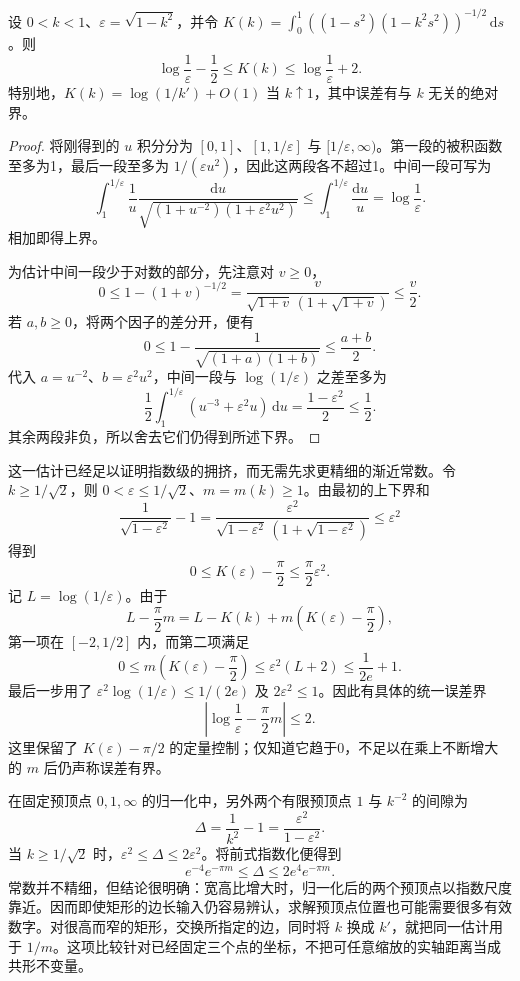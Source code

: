 \begin{proposition}[完全椭圆积分的对数界]\label{b3:prop:07-elliptic-log-bounds}
设 \(0<k<1\)、\(\varepsilon=\sqrt{1-k^2}\)，并令
\(K(k)=\int_0^1((1-s^2)(1-k^2s^2))^{-1/2}\,\mathrm{d}s\)。则
\[
 \log\frac1\varepsilon-\frac12
 \le K(k)\le\log\frac1\varepsilon+2.
\]
特别地，\(K(k)=\log(1/k')+O(1)\) 当 \(k\uparrow1\)，其中误差有与 \(k\) 无关的绝对界。
\end{proposition}
\begin{proof}
将刚得到的 \(u\) 积分分为 \([0,1]\)、\([1,1/\varepsilon]\) 与 \([1/\varepsilon,\infty)\)。第一段的被积函数至多为1，最后一段至多为 \(1/(\varepsilon u^2)\)，因此这两段各不超过1。中间一段可写为
\[
 \int_1^{1/\varepsilon}\frac1u
 \frac{\mathrm{d}u}{\sqrt{(1+u^{-2})(1+\varepsilon^2u^2)}}
 \le\int_1^{1/\varepsilon}\frac{\mathrm{d}u}{u}
 =\log\frac1\varepsilon.
\]
相加即得上界。

为估计中间一段少于对数的部分，先注意对 \(v\ge0\)，
\[
 0\le1-(1+v)^{-1/2}
 =\frac{v}{\sqrt{1+v}\,(1+\sqrt{1+v})}
 \le\frac v2.
\]
若 \(a,b\ge0\)，将两个因子的差分开，便有
\[
 0\le1-\frac1{\sqrt{(1+a)(1+b)}}
 \le\frac{a+b}{2}.
\]
代入 \(a=u^{-2}\)、\(b=\varepsilon^2u^2\)，中间一段与 \(\log(1/\varepsilon)\) 之差至多为
\[
 \frac12\int_1^{1/\varepsilon}
 (u^{-3}+\varepsilon^2u)\,\mathrm{d}u
 =\frac{1-\varepsilon^2}{2}\le\frac12.
\]
其余两段非负，所以舍去它们仍得到所述下界。
\end{proof}

这一估计已经足以证明指数级的拥挤，而无需先求更精细的渐近常数。令 \(k\ge1/\sqrt2\)，则 \(0<\varepsilon\le1/\sqrt2\)、\(m=m(k)\ge1\)。由最初的上下界和
\[
 \frac1{\sqrt{1-\varepsilon^2}}-1
 =\frac{\varepsilon^2}
 {\sqrt{1-\varepsilon^2}\,(1+\sqrt{1-\varepsilon^2})}
 \le\varepsilon^2
\]
得到
\[
 0\le K(\varepsilon)-\frac\pi2
 \le\frac\pi2\varepsilon^2.
\]
记 \(L=\log(1/\varepsilon)\)。由于
\[
 L-\frac\pi2m
 =L-K(k)+m\left(K(\varepsilon)-\frac\pi2\right),
\]
第一项在 \([-2,1/2]\) 内，而第二项满足
\[
 0\le m\left(K(\varepsilon)-\frac\pi2\right)
 \le\varepsilon^2(L+2)
 \le\frac1{2e}+1.
\]
最后一步用了 \(\varepsilon^2\log(1/\varepsilon)\le1/(2e)\) 及 \(2\varepsilon^2\le1\)。因此有具体的统一误差界
\[
 \left|\log\frac1\varepsilon-\frac\pi2m\right|\le2.
\]
这里保留了 \(K(\varepsilon)-\pi/2\) 的定量控制；仅知道它趋于0，不足以在乘上不断增大的 \(m\) 后仍声称误差有界。

\ProseParagraphBreak

在固定预顶点 \(0,1,\infty\) 的归一化中，另外两个有限预顶点 \(1\) 与 \(k^{-2}\) 的间隙为
\[
 \Delta=\frac1{k^2}-1=\frac{\varepsilon^2}{1-\varepsilon^2}.
\]
当 \(k\ge1/\sqrt2\) 时，\(\varepsilon^2\le\Delta\le2\varepsilon^2\)。将前式指数化便得到
\[
 e^{-4}e^{-\pi m}\le\Delta\le2e^4e^{-\pi m}.
\]
常数并不精细，但结论很明确：宽高比增大时，归一化后的两个预顶点以指数尺度靠近。因而即使矩形的边长输入仍容易辨认，求解预顶点位置也可能需要很多有效数字。对很高而窄的矩形，交换所指定的边，同时将 \(k\) 换成 \(k'\)，就把同一估计用于 \(1/m\)。这项比较针对已经固定三个点的坐标，不把可任意缩放的实轴距离当成共形不变量。

